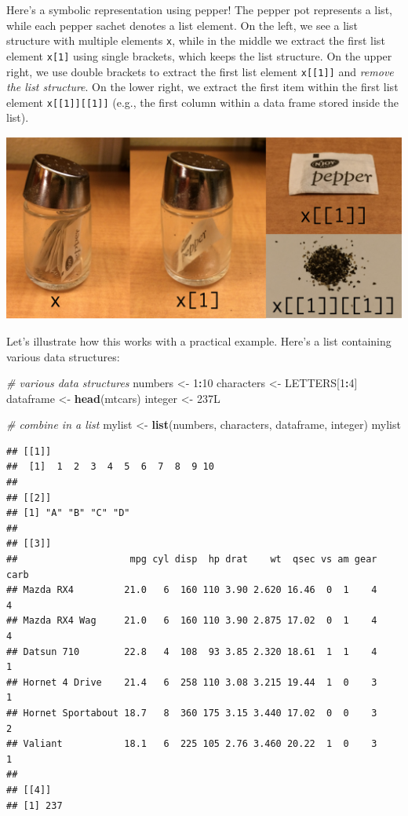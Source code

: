 \documentclass[
]{book}
\newenvironment{Shaded}{\begin{snugshade}}{\end{snugshade}}
\newcommand{\CommentTok}[1]{\textcolor[rgb]{0.56,0.35,0.01}{\textit{#1}}}
\newcommand{\DecValTok}[1]{\textcolor[rgb]{0.00,0.00,0.81}{#1}}
\newcommand{\KeywordTok}[1]{\textcolor[rgb]{0.13,0.29,0.53}{\textbf{#1}}}
\newcommand{\NormalTok}[1]{#1}
\newcommand{\OperatorTok}[1]{\textcolor[rgb]{0.81,0.36,0.00}{\textbf{#1}}}
\newcommand{\StringTok}[1]{\textcolor[rgb]{0.31,0.60,0.02}{#1}}
\begin{document}
Here's a symbolic representation using pepper! The pepper pot represents a list, while each pepper sachet denotes a list element. On the left, we see a list structure with multiple elements \texttt{x}, while in the middle we extract the first list element \texttt{x{[}1{]}} using single brackets, which keeps the list structure. On the upper right, we use double brackets to extract the first list element \texttt{x{[}{[}1{]}{]}} and \emph{remove the list structure}. On the lower right, we extract the first item within the first list element \texttt{x{[}{[}1{]}{]}{[}{[}1{]}{]}} (e.g., the first column within a data frame stored inside the list).

\includegraphics{R/RDataWrangling/images/indexing_lists.png}

Let's illustrate how this works with a practical example. Here's a list containing various data structures:

\begin{Shaded}
\begin{Highlighting}[]
\CommentTok{\# various data structures}
\NormalTok{numbers \textless{}{-}}\StringTok{ }\DecValTok{1}\OperatorTok{:}\DecValTok{10}
\NormalTok{characters \textless{}{-}}\StringTok{ }\NormalTok{LETTERS[}\DecValTok{1}\OperatorTok{:}\DecValTok{4}\NormalTok{]}
\NormalTok{dataframe \textless{}{-}}\StringTok{ }\KeywordTok{head}\NormalTok{(mtcars)}
\NormalTok{integer \textless{}{-}}\StringTok{ }\NormalTok{237L}

\CommentTok{\# combine in a list}
\NormalTok{mylist \textless{}{-}}\StringTok{ }\KeywordTok{list}\NormalTok{(numbers, characters, dataframe, integer)}
\NormalTok{mylist}
\end{Highlighting}
\end{Shaded}

\begin{verbatim}
## [[1]]
##  [1]  1  2  3  4  5  6  7  8  9 10
## 
## [[2]]
## [1] "A" "B" "C" "D"
## 
## [[3]]
##                    mpg cyl disp  hp drat    wt  qsec vs am gear carb
## Mazda RX4         21.0   6  160 110 3.90 2.620 16.46  0  1    4    4
## Mazda RX4 Wag     21.0   6  160 110 3.90 2.875 17.02  0  1    4    4
## Datsun 710        22.8   4  108  93 3.85 2.320 18.61  1  1    4    1
## Hornet 4 Drive    21.4   6  258 110 3.08 3.215 19.44  1  0    3    1
## Hornet Sportabout 18.7   8  360 175 3.15 3.440 17.02  0  0    3    2
## Valiant           18.1   6  225 105 2.76 3.460 20.22  1  0    3    1
## 
## [[4]]
## [1] 237
\end{verbatim}
\end{document}

